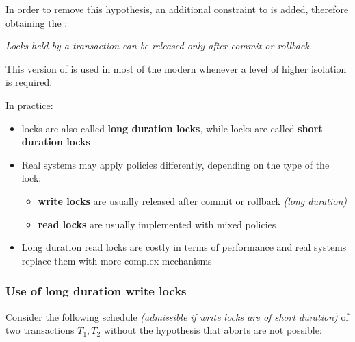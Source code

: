 \documentclass[english]{article}
\begin{document}
In order to remove this hypothesis, an additional constraint to \TPL is added, therefore obtaining the \textbf{\STPL}:

\textit{Locks held by a transaction can be released only after commit or rollback.}

This version of \TPL is used in most of the modern \DBMS whenever a level of higher isolation is required.

\bigskip
In practice:
\begin{itemize}
  \item \STPL locks are also called \textbf{long duration locks}, while \TPL locks are called \textbf{short duration locks}
  \item Real systems may apply \TPL policies differently, depending on the type of the lock:
        \begin{itemize}
          \item \textbf{write locks} are usually released after commit or rollback \textit{(long duration)}
          \item \textbf{read locks} are usually implemented with mixed policies
        \end{itemize}
  \item Long duration read locks are costly in terms of performance and real systems replace them with more complex mechanisms
\end{itemize}

\subsubsection{Use of long duration write locks}

Consider the following schedule \textit{(admissible if write locks are of short duration)} of two transactions \(T_1, T_2\) without the hypothesis that aborts are not possible:
\end{document}
